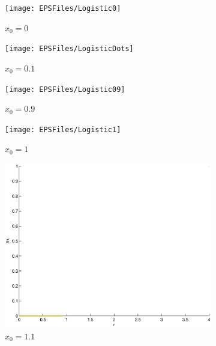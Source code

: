 \documentclass[a4wide, 10pt]{article}
\begin{document}
\begin{figure}[H]
        \centering
        \begin{subfigure}[b]{0.2\textwidth}
                \texttt{[image: EPSFiles/Logistic0]}
                \caption{$x_{0} = 0$}
        \end{subfigure}
        \begin{subfigure}[b]{0.2\textwidth}
                \texttt{[image: EPSFiles/LogisticDots]}
                \caption{$x_{0} = 0.1$}
        \end{subfigure}
        \begin{subfigure}[b]{0.2\textwidth}
                \texttt{[image: EPSFiles/Logistic09]}
                \caption{$x_{0} = 0.9$}
        \end{subfigure}
        
        \begin{subfigure}[b]{0.2\textwidth}
                \texttt{[image: EPSFiles/Logistic1]}
                \caption{$x_{0} = 1$}
        \end{subfigure}
        \begin{subfigure}[b]{0.2\textwidth}
                \includegraphics[width=\textwidth]{EPSFiles/Logistic11}
                \caption{$x_{0} = 1.1$}
        \end{subfigure}  
        \begin{subfigure}[b]{0.2\textwidth}

\end{subfigure}
\end{figure}
\end{document}
